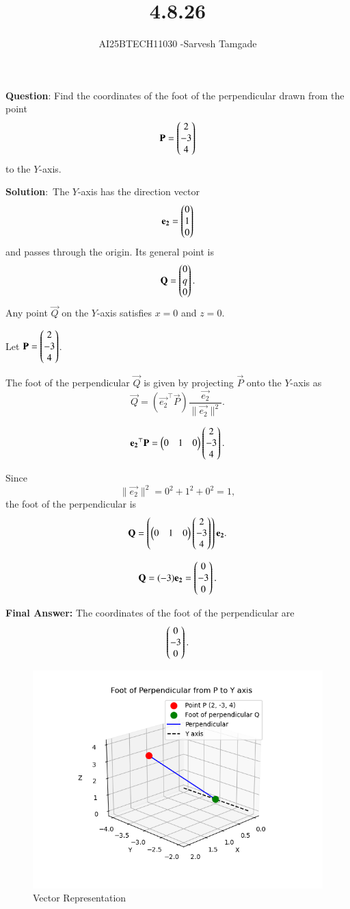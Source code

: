 \documentclass[journal]{IEEEtran}
\begin{document}

\vspace{3cm}

\title{4.8.26}
\author{AI25BTECH11030 -Sarvesh Tamgade}
{\let\newpage\relax\maketitle}

\renewcommand{\thefigure}{\theenumi}
\renewcommand{\thetable}{\theenumi}
\setlength{\intextsep}{10pt} 


\renewcommand{\thetable}{\theenumi}


\textbf{Question}: Find the coordinates of the foot of the perpendicular drawn from the point
\[
\mathbf{P} = \begin{pmatrix}2 \\ -3 \\ 4\end{pmatrix}
\]
to the \(Y\)-axis.

\textbf{Solution}:\
The \(Y\)-axis has the direction vector
\[
\mathbf{e_{2}} = \begin{pmatrix}0 \\ 1 \\ 0\end{pmatrix}
\]
and passes through the origin. Its general point is
\[
\mathbf{Q} = \begin{pmatrix}0 \\ q \\ 0\end{pmatrix}.
\]
Any point \(\vec{Q}\) on the \(Y\)-axis satisfies \(x = 0\) and \(z = 0\).

Let \(\mathbf{P} = \begin{pmatrix}2 \\ -3 \\ 4\end{pmatrix}\).

The foot of the perpendicular \(\vec{Q}\) is given by projecting \(\vec{P}\) onto the \(Y\)-axis as
\[
\vec{Q} = \left(\vec{e_{2}}^\top \vec{P}\right) \frac{\vec{e_{2}}}{\|\vec{e_{2}}\|^2}.
\]


\[
\mathbf{e_{2}}^\top \mathbf{P} = \begin{pmatrix}0 & 1 & 0\end{pmatrix} \begin{pmatrix}2 \\ -3 \\ 4\end{pmatrix}.
\]

Since 
\[
\|\vec{e_{2}}\|^2 = 0^2 + 1^2 + 0^2 = 1,
\]
the foot of the perpendicular is
\[
\mathbf{Q} = \left( \begin{pmatrix}0 & 1 & 0\end{pmatrix} \begin{pmatrix}2 \\ -3 \\ 4\end{pmatrix} \right) \mathbf{e_{2}}.
\]

\[
\mathbf{Q} = (-3) \mathbf{e_{2}} = \begin{pmatrix}0 \\ -3 \\ 0\end{pmatrix}.
\]

\textbf{Final Answer:} The coordinates of the foot of the perpendicular are
\[
\begin{pmatrix}0 \\ -3 \\ 0\end{pmatrix}.
\]

\begin{figure}[htbp]
    \centering
    \includegraphics[width=0.65\linewidth]{FIG/fig1.png}
    \caption{Vector Representation}
    \label{fig:FIG/fig1.png}
    \end{figure}
\end{document}

